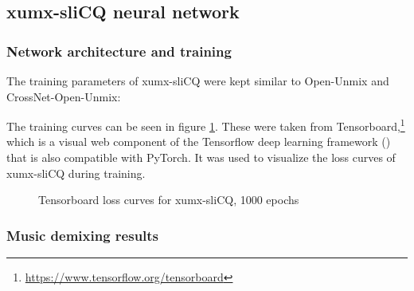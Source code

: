 \documentclass[report.tex]{subfiles}
\begin{document}
\newpagefill

\subsection{xumx-sliCQ neural network}

\subsubsection{Network architecture and training}

The training parameters of xumx-sliCQ were kept similar to Open-Unmix and CrossNet-Open-Unmix:

The training curves can be seen in figure \ref{fig:networkloss}. These were taken from Tensorboard,\footnote{\url{https://www.tensorflow.org/tensorboard}} which is a visual web component of the Tensorflow deep learning framework (\cite{tensorflow}) that is also compatible with PyTorch. It was used to visualize the loss curves of xumx-sliCQ during training.

\begin{figure}[ht]
	\centering
	\hspace{0.5em}
	\caption{Tensorboard loss curves for xumx-sliCQ, 1000 epochs}
	\label{fig:networkloss}
\end{figure}

\newpagefill

\subsubsection{Music demixing results}
\end{document}
